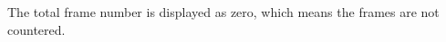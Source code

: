 \documentclass[xcolor={dvipsnames,table},11pt]{beamer}
\begin{document}
\frame{}

\begin{frame}[allowframebreaks]
\begin{thebibliography}{}
\bibitem{} The total frame number is displayed as zero,
\framebreak
\bibitem{} which means the frames are not countered.
\end{thebibliography}
\end{frame}
\addtocounter{framenumber}{-2}
\end{document}
